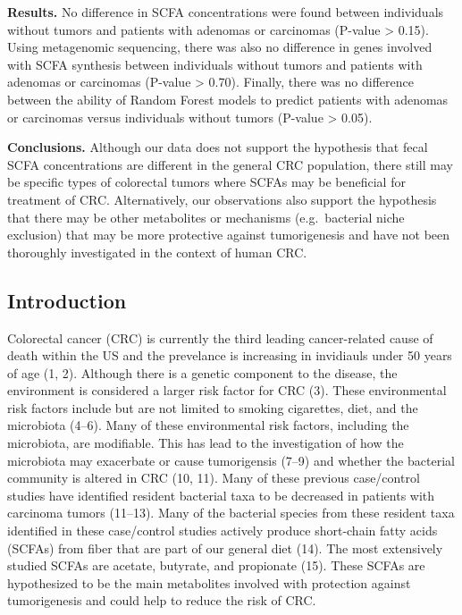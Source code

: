 \documentclass[11pt,]{article}
\begin{document}
\textbf{Results.} No difference in SCFA concentrations were found
between individuals without tumors and patients with adenomas or
carcinomas (P-value \textgreater{} 0.15). Using metagenomic sequencing,
there was also no difference in genes involved with SCFA synthesis
between individuals without tumors and patients with adenomas or
carcinomas (P-value \textgreater{} 0.70). Finally, there was no
difference between the ability of Random Forest models to predict
patients with adenomas or carcinomas versus individuals without tumors
(P-value \textgreater{} 0.05).

\textbf{Conclusions.} Although our data does not support the hypothesis
that fecal SCFA concentrations are different in the general CRC
population, there still may be specific types of colorectal tumors where
SCFAs may be beneficial for treatment of CRC. Alternatively, our
observations also support the hypothesis that there may be other
metabolites or mechanisms (e.g.~bacterial niche exclusion) that may be
more protective against tumorigenesis and have not been thoroughly
investigated in the context of human CRC.

\newpage

\subsection{Introduction}\label{introduction}

Colorectal cancer (CRC) is currently the third leading cancer-related
cause of death within the US and the prevelance is increasing in
invidiauls under 50 years of age (1, 2). Although there is a genetic
component to the disease, the environment is considered a larger risk
factor for CRC (3). These environmental risk factors include but are not
limited to smoking cigarettes, diet, and the microbiota (4--6). Many of
these environmental risk factors, including the microbiota, are
modifiable. This has lead to the investigation of how the microbiota may
exacerbate or cause tumorigensis (7--9) and whether the bacterial
community is altered in CRC (10, 11). Many of these previous
case/control studies have identified resident bacterial taxa to be
decreased in patients with carcinoma tumors (11--13). Many of the
bacterial species from these resident taxa identified in these
case/control studies actively produce short-chain fatty acids (SCFAs)
from fiber that are part of our general diet (14). The most extensively
studied SCFAs are acetate, butyrate, and propionate (15). These SCFAs
are hypothesized to be the main metabolites involved with protection
against tumorigenesis and could help to reduce the risk of CRC.
\end{document}
